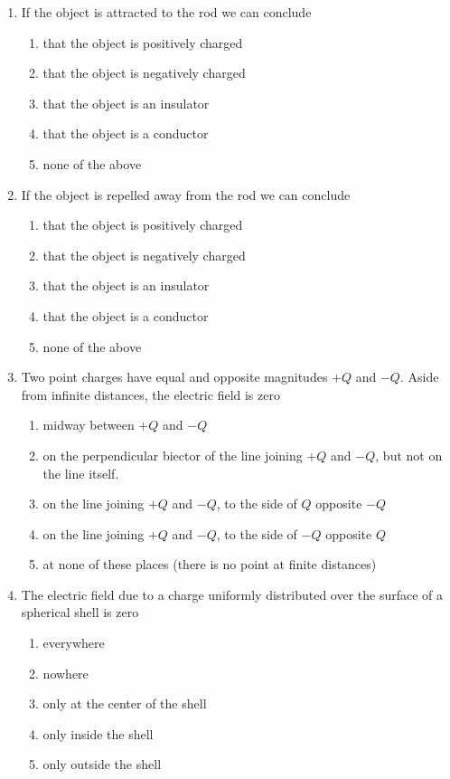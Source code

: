\documentclass[10pt]{article}
\begin{document}
\begin{enumerate}[resume, itemsep = 5mm]
  \item
    If the object is attracted to the rod we can conclude
    \begin{enumerate}
      \item that the object is positively charged
      \item that the object is negatively charged
      \item that the object is an insulator
      \item that the object is a conductor
      \item none of the above
    \end{enumerate}

  \item
    If the object is repelled away from the rod we can conclude
    \begin{enumerate}
      \item that the object is positively charged
      \item that the object is negatively charged
      \item that the object is an insulator
      \item that the object is a conductor
      \item none of the above
    \end{enumerate}

  \item
    Two point charges have equal and opposite magnitudes $+Q$ and
    $-Q$.  Aside from infinite distances, the electric field is zero
    \begin{enumerate}
      \item midway between $+Q$ and $-Q$
      \item on the perpendicular biector of the line joining $+Q$ and
        $-Q$, but not on the line itself.
      \item on the line joining $+Q$ and $-Q$, to the side of $Q$
        opposite $-Q$
      \item on the line joining $+Q$ and $-Q$, to the side of $-Q$
        opposite $Q$
      \item at none of these places (there is no point at finite
        distances)
    \end{enumerate}

  \item The electric field due to a charge uniformly distributed over
    the surface of a spherical shell is zero
    \begin{enumerate}
      \item everywhere
      \item nowhere
      \item only at the center of the shell
      \item only inside the shell
      \item only outside the shell
    \end{enumerate}


\end{enumerate}
\end{document}
